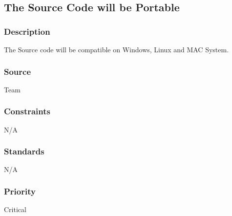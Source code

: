 
\subsection{The Source Code will be Portable }
\subsubsection{Description}
The Source code will be compatible on Windows, Linux and MAC System.
\subsubsection{Source}
Team
\subsubsection{Constraints}
N/A
\subsubsection{Standards}
N/A
\subsubsection{Priority}
Critical